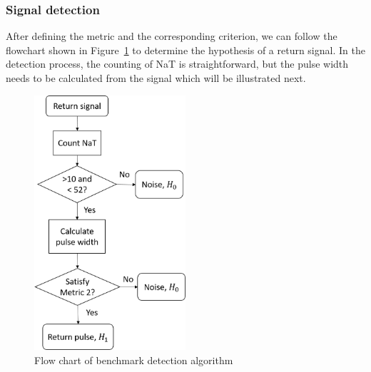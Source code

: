 \subsubsection{Signal detection}
After defining the metric and the corresponding criterion, we can follow the flowchart shown in Figure~\ref{fig:bm_flowchart} to determine the hypothesis of a return signal. In the detection process, the counting of NaT is straightforward, but the pulse width needs to be calculated from the signal which will be illustrated next.
\begin{figure}[htb] %
\centering
\graphicspath{ {figures/} }
\includegraphics[width=0.5\textwidth]{figures/chapter6_ADC/BM_flowchart.png}
\caption{Flow chart of benchmark detection algorithm}
\label{fig:bm_flowchart}
\end{figure}

